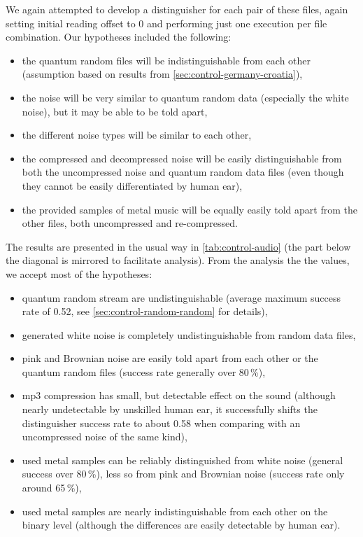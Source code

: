 \documentclass[12pt,oneside]{fithesis2}
\newcommand{\squarebullet}{\textcolor{black}{\raisebox{0.15em}{\rule{4pt}{4pt}}}}
\newenvironment{myItemize}{
  \begin{itemize}[leftmargin=2em,rightmargin=1em,itemsep=\parskip ,parsep=0em,topsep=0em,partopsep=0em]
  \renewcommand{\labelitemi}{\squarebullet}
  \renewcommand{\labelitemii}{$\diamond$}
}{
  \end{itemize}
}
\begin{document}
We again attempted to develop a distinguisher for each pair of these files, again setting initial reading offset to 0
and performing just one execution per file combination. Our hypotheses included the following:
\begin{myItemize}
\item the quantum random files will be indistinguishable from each other (assumption based on results from 
\autoref{sec:control-germany-croatia}),
\item the noise will be very similar to quantum random data (especially the white noise), but it may be able to be told apart,
\item the different noise types will be similar to each other,
\item the compressed and decompressed noise will be easily distinguishable from both the uncompressed noise and quantum random data
files (even though they cannot be easily differentiated by human ear),
\item the provided samples of metal music will be equally easily told apart from the other files, both uncompressed and re-compressed.
\end{myItemize}

\noindent
The results are presented in the usual way in \autoref{tab:control-audio} (the part below the diagonal is mirrored to
facilitate analysis). From the analysis the the values, we accept most of the hypotheses:
\begin{myItemize}
\item quantum random stream are undistinguishable (average maximum success rate of 0.52, see \autoref{sec:control-random-random}
for details),
\item generated white noise is completely undistinguishable from random data files,
\item pink and Brownian noise are easily told apart from each other or the quantum random files (success rate generally over 80\,\%),
\item mp3 compression has small, but detectable effect on the sound (although nearly undetectable by unskilled human ear, 
it successfully shifts the distinguisher success rate to about 0.58 when comparing with an uncompressed noise of the same kind),
\item used metal samples can be reliably distinguished from white noise (general success over 80\,\%), 
less so from pink and Brownian noise (success rate only around 65\,\%),
\item used metal samples are nearly indistinguishable from each other on the binary level 
(although the differences are easily detectable by human ear).
\end{myItemize}
\end{document}
